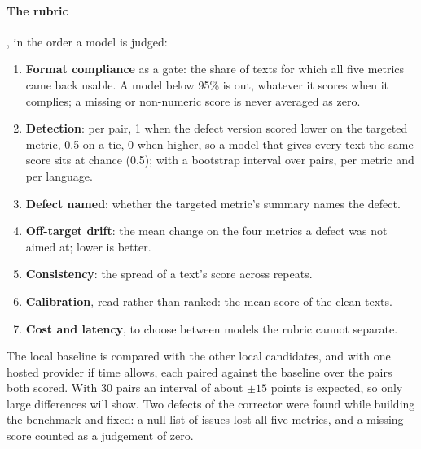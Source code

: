 \paragraph{The rubric}, in the order a model is judged:
\begin{enumerate}
    \item \textbf{Format compliance} as a gate: the share of texts for
    which all five metrics came back usable. A model below 95\% is out,
    whatever it scores when it complies; a missing or non-numeric
    score is never averaged as zero.
    \item \textbf{Detection}: per pair, 1 when the defect version scored
    lower on the targeted metric, 0.5 on a tie, 0 when higher, so a
    model that gives every text the same score sits at chance (0.5);
    with a bootstrap interval over pairs, per metric and per language.
    \item \textbf{Defect named}: whether the targeted metric's summary
    names the defect.
    \item \textbf{Off-target drift}: the mean change on the four metrics
    a defect was not aimed at; lower is better.
    \item \textbf{Consistency}: the spread of a text's score across
    repeats.
    \item \textbf{Calibration}, read rather than ranked: the mean score
    of the clean texts.
    \item \textbf{Cost and latency}, to choose between models the
    rubric cannot separate.
\end{enumerate}

The local baseline is compared with the other local candidates, and
with one hosted provider if time allows, each paired against the
baseline over the pairs both scored. With 30 pairs an interval of about
$\pm15$ points is expected, so only large differences will show. Two
defects of the corrector were found while building the benchmark and
fixed: a null list of issues lost all five metrics, and a missing score
counted as a judgement of zero.

